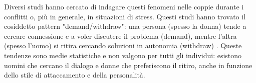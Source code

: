 \documentclass[12pt]{book} %
\begin{document}
Diversi studi hanno cercato di indagare questi fenomeni nelle coppie durante i conflitti o, più in generale, in situazioni di stress. Questi studi hanno trovato il cosiddetto pattern "demand/withdraw": una persona (spesso la donna) tende a cercare connessione e a voler discutere il problema (demand), mentre l’altra (spesso l’uomo) si ritira cercando soluzioni in autonomia (withdraw)   . Queste tendenze sono medie statistiche e non valgono per tutti gli individui: esistono uomini che cercano il dialogo e donne che preferiscono il ritiro, anche in funzione dello stile di attaccamento e della personalità.
\end{document}
